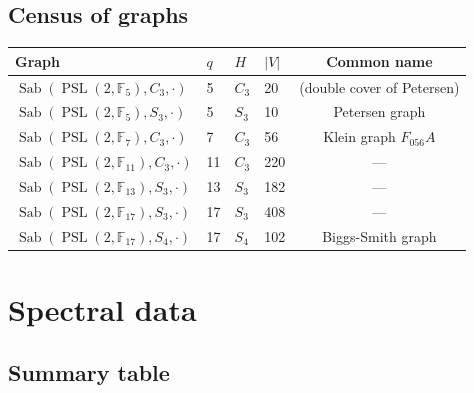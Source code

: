 \documentclass[11pt,a4paper]{article}
\theoremstyle{plain}
\theoremstyle{definition}
\theoremstyle{remark}
\newcommand{\F}{\mathbb{F}}
\newcommand{\PSL}{\operatorname{PSL}}
\newcommand{\Sab}{\operatorname{Sab}}
\begin{document}
\subsection{Census of graphs}

\begin{tcolorbox}[colback=black!5, colframe=black!5,
  boxrule=0pt, sharp corners]
\begin{center}
\begin{tabular}{llllc}
\toprule
Graph & $q$ & $H$ & $|V|$ & Common name \\
\midrule
$\Sab(\PSL(2,\F_5), C_3, \cdot)$ & 5 & $C_3$ & 20 & (double cover of Petersen) \\
$\Sab(\PSL(2,\F_5), S_3, \cdot)$ & 5 & $S_3$ & 10 & Petersen graph \\
$\Sab(\PSL(2,\F_7), C_3, \cdot)$ & 7 & $C_3$ & 56 & Klein graph $F_{056}A$ \\
$\Sab(\PSL(2,\F_{11}), C_3, \cdot)$ & 11 & $C_3$ & 220 & --- \\
$\Sab(\PSL(2,\F_{13}), S_3, \cdot)$ & 13 & $S_3$ & 182 & --- \\
$\Sab(\PSL(2,\F_{17}), S_3, \cdot)$ & 17 & $S_3$ & 408 & --- \\
$\Sab(\PSL(2,\F_{17}), S_4, \cdot)$ & 17 & $S_4$ & 102 & Biggs-Smith graph \\
\bottomrule
\end{tabular}
\end{center}
\end{tcolorbox}


\section{Spectral data}

\subsection{Summary table}
\end{document}
